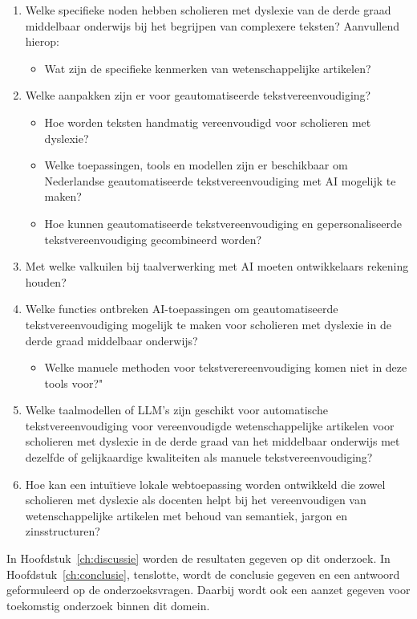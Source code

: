 \begin{enumerate}
	\item Welke specifieke noden hebben scholieren met dyslexie van de derde graad middelbaar onderwijs bij het begrijpen van complexere teksten? Aanvullend hierop: 
	\begin{itemize}
		\item Wat zijn de specifieke kenmerken van wetenschappelijke artikelen?
	\end{itemize} 
	\item Welke aanpakken zijn er voor geautomatiseerde tekstvereenvoudiging?
	\begin{itemize}
		\item Hoe worden teksten handmatig vereenvoudigd voor scholieren met dyslexie?
		\item Welke toepassingen, tools en modellen zijn er beschikbaar om Nederlandse geautomatiseerde tekstvereenvoudiging met AI mogelijk te maken?
		\item Hoe kunnen geautomatiseerde tekstvereenvoudiging en gepersonaliseerde tekstvereenvoudiging gecombineerd worden?
	\end{itemize}
	\item Met welke valkuilen bij taalverwerking met AI moeten ontwikkelaars rekening houden?
	\item Welke functies ontbreken AI-toepassingen om geautomatiseerde tekstvereenvoudiging mogelijk te maken voor scholieren met dyslexie in de derde graad middelbaar onderwijs? 
	\begin{itemize}
		\item Welke manuele methoden voor tekstverereenvoudiging komen niet in deze tools voor?"
	\end{itemize}
	\item Welke taalmodellen of LLM's zijn geschikt voor automatische tekstvereenvoudiging voor vereenvoudigde wetenschappelijke artikelen voor scholieren met dyslexie in de derde graad van het middelbaar onderwijs met dezelfde of gelijkaardige kwaliteiten als manuele tekstvereenvoudiging?
	\item Hoe kan een intuïtieve lokale webtoepassing worden ontwikkeld die zowel scholieren met dyslexie als docenten helpt bij het vereenvoudigen van wetenschappelijke artikelen met behoud van semantiek, jargon en zinsstructuren?
\end{enumerate}

In Hoofdstuk~\ref{ch:discussie} worden de resultaten gegeven op dit onderzoek. In Hoofdstuk~\ref{ch:conclusie}, tenslotte, wordt de conclusie gegeven en een antwoord geformuleerd op de onderzoeksvragen. Daarbij wordt ook een aanzet gegeven voor toekomstig onderzoek binnen dit domein.